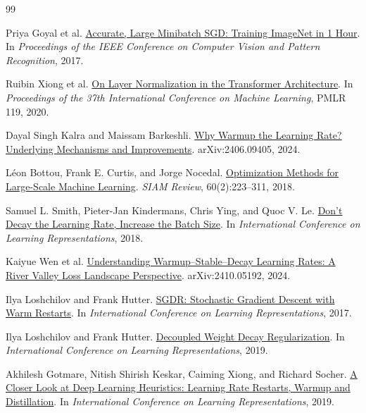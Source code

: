 \documentclass[11pt,letterpaper]{article}
\begin{document}
\begin{thebibliography}{99}

Priya Goyal et al.
\newblock \href{https://arxiv.org/abs/1706.02677}{Accurate, Large Minibatch
SGD: Training ImageNet in 1 Hour}.
\newblock In \emph{Proceedings of the IEEE Conference on Computer Vision and
Pattern Recognition}, 2017.

Ruibin Xiong et al.
\newblock \href{https://proceedings.mlr.press/v119/xiong20b.html}{On Layer
Normalization in the Transformer Architecture}.
\newblock In \emph{Proceedings of the 37th International Conference on
Machine Learning}, PMLR 119, 2020.

Dayal Singh Kalra and Maissam Barkeshli.
\newblock \href{https://arxiv.org/abs/2406.09405}{Why Warmup the Learning
Rate? Underlying Mechanisms and Improvements}.
\newblock arXiv:2406.09405, 2024.

L\'eon Bottou, Frank E. Curtis, and Jorge Nocedal.
\newblock \href{https://doi.org/10.1137/16M1080173}{Optimization Methods for
Large-Scale Machine Learning}.
\newblock \emph{SIAM Review}, 60(2):223--311, 2018.

Samuel L. Smith, Pieter-Jan Kindermans, Chris Ying, and Quoc V. Le.
\newblock \href{https://openreview.net/forum?id=B1Yy1BxCZ}{Don't Decay the
Learning Rate, Increase the Batch Size}.
\newblock In \emph{International Conference on Learning Representations},
2018.

Kaiyue Wen et al.
\newblock \href{https://arxiv.org/abs/2410.05192}{Understanding
Warmup--Stable--Decay Learning Rates: A River Valley Loss Landscape
Perspective}.
\newblock arXiv:2410.05192, 2024.

Ilya Loshchilov and Frank Hutter.
\newblock \href{https://arxiv.org/abs/1608.03983}{SGDR: Stochastic Gradient
Descent with Warm Restarts}.
\newblock In \emph{International Conference on Learning Representations},
2017.

Ilya Loshchilov and Frank Hutter.
\newblock
\href{https://openreview.net/forum?id=Bkg6RiCqY7}{Decoupled Weight Decay
Regularization}.
\newblock In \emph{International Conference on Learning Representations},
2019.

Akhilesh Gotmare, Nitish Shirish Keskar, Caiming Xiong, and Richard Socher.
\newblock \href{https://arxiv.org/abs/1810.13243}{A Closer Look at Deep
Learning Heuristics: Learning Rate Restarts, Warmup and Distillation}.
\newblock In \emph{International Conference on Learning Representations},
2019.


\end{thebibliography}
\end{document}

